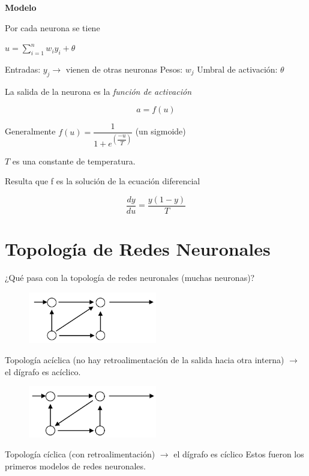 \textbf{Modelo}

Por cada neurona se tiene

$u = \sum_{i=1}^{n} w_i y_i + \theta $

Entradas: $ y_j \rightarrow $  vienen de otras neuronas
Pesos: $w_j$
Umbral de activación: $ \theta $

La salida de la neurona es la \textit{función de activación}

$$
a=f(u)
$$

Generalmente $ f(u) = \dfrac{1}{1 + e^(\dfrac{-u}{T})}$ (un sigmoide)

$T$ es una constante de temperatura. 


Resulta que f es la solución de la ecuación diferencial 

$$
\dfrac{dy}{du} = \dfrac{y(1-y)}{T}
$$


\section{Topología de Redes Neuronales}

¿Qué pasa con la topología de redes neuronales (muchas neuronas)?

\begin{figure}[h!]
	\centering
	\includegraphics[width=0.5\textwidth]{images/img74.png}
	\label{figura74}
\end{figure}
\break

Topología acíclica (no hay retroalimentación de la salida hacia otra interna) $\rightarrow$ el dígrafo es acíclico.

\begin{figure}[h!]
	\centering
	\includegraphics[width=0.5\textwidth]{images/img75.png}
	\label{figura75}
\end{figure}


Topología cíclica (con retroalimentación) $\rightarrow$ el dígrafo es cíclico
Estos fueron los primeros modelos de redes neuronales.

